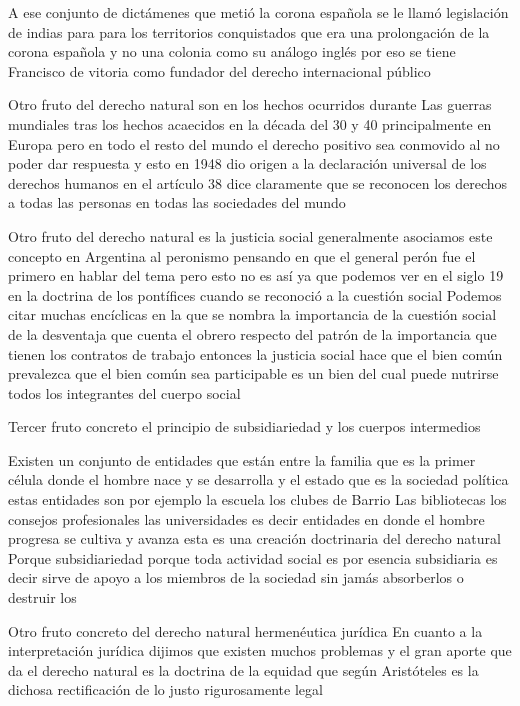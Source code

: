 \documentclass[12pt]{book}
\begin{document}
A ese conjunto de dictámenes que metió la corona española se le llamó legislación de indias para para los territorios conquistados que era una prolongación de la corona española y no una colonia como su análogo inglés por eso se tiene Francisco de vitoria como fundador del derecho internacional público

Otro fruto del derecho natural son en los hechos ocurridos durante Las guerras mundiales tras los hechos acaecidos en la década del 30 y 40 principalmente en Europa pero en todo el resto del mundo el derecho positivo sea conmovido al no poder dar respuesta y esto en 1948 dio origen a la declaración universal de los derechos humanos en el artículo 38 dice claramente que se reconocen los derechos a todas las personas en todas las sociedades del mundo

Otro fruto del derecho natural es la justicia social generalmente asociamos este concepto en Argentina al peronismo pensando en que el general perón fue el primero en hablar del tema pero esto no es así ya que podemos ver en el siglo 19 en la doctrina de los pontífices cuando se reconoció a la cuestión social
Podemos citar muchas encíclicas en la que se nombra la importancia de la cuestión social de la desventaja que cuenta el obrero respecto del patrón de la importancia que tienen los contratos de trabajo entonces la justicia social hace que el bien común prevalezca que el bien común sea participable es un bien del cual puede nutrirse todos los integrantes del cuerpo social

Tercer fruto concreto el principio de subsidiariedad y los cuerpos intermedios

Existen un conjunto de entidades que están entre la familia que es la primer célula donde el hombre nace y se desarrolla y el estado que es la sociedad política estas entidades son por ejemplo la escuela los clubes de Barrio Las bibliotecas los consejos profesionales las universidades es decir entidades en donde el hombre progresa se cultiva y avanza esta es una creación doctrinaria del derecho natural
Porque subsidiariedad porque toda actividad social es por esencia subsidiaria es decir sirve de apoyo a los miembros de la sociedad sin jamás absorberlos o destruir los

Otro fruto concreto del derecho natural hermenéutica jurídica
En cuanto a la interpretación jurídica dijimos que existen muchos problemas y el gran aporte que da el derecho natural es la doctrina de la equidad que según Aristóteles es la dichosa rectificación de lo justo rigurosamente legal
\end{document}
